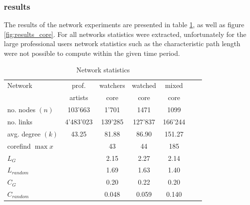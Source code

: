 \subsubsection{results}
The results of the network experiments are presented in table \ref{tab:netstatistics}, as well as figure \ref{fig:results_core}.  For all networks statistics were extracted, unfortunately for the large professional users network statistics such as the characteristic path length were not possible to compute within the given time period.

\begin{table}[htb]
    \centering
    \begin{tabular}
        { | l | c | c | c | c | c | c|} 
        \hline
        Network &  prof.  & watchers & watched & mixed\\
	            &  artists & core & core & core \\
        \hline
	no. nodes $(n)$& 103'663 & 1'701 & 1471 & 1099 \\
	no. links & 4'483'023 & 139'285 & 127'837  & 166'244 \\
	avg. degree $(k)$& 43.25 & 81.88 & 86.90 & 151.27 \\
	corefind $\max x$ & & 43 & 44 & 185\\
	$L_G$ & & 2.15 & 2.27 & 2.14 \\
	$L_{random}$ & & 1.69 & 1.63 & 1.40 \\
	$C_G$ & & 0.20 & 0.22 & 0.20 \\
	$C_{random}$ & & 0.048 & 0.059 & 0.140 \\
	\hline
    \end{tabular}
    \caption{Network statistics}
    \label{tab:netstatistics}
\end{table}


